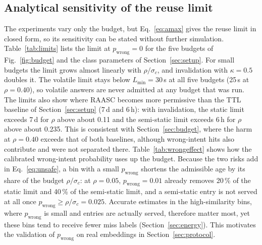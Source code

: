 \documentclass[journal]{IEEEtran}
\newcommand{\pct}{\,\%}
\begin{document}
\subsection{Analytical sensitivity of the reuse limit}\label{sec:sens}
The experiments vary only the budget, but Eq.~\eqref{eq:amax} gives the reuse limit in closed form, so its sensitivity can be stated without further simulation. Table~\ref{tab:limits} lists the limit at $p_{\text{wrong}}=0$ for the five budgets of Fig.~\ref{fig:budget} and the class parameters of Section~\ref{sec:setup}. For small budgets the limit grows almost linearly with $\rho/\sigma_c$, and invalidation with $\kappa=0.5$ doubles it. The volatile limit stays below $L_{\min}=30\,$s at all five budgets (25\,s at $\rho=0.40$), so volatile answers are never admitted at any budget that was run. The limits also show where RAASC becomes more permissive than the TTL baseline of Section~\ref{sec:setup} (7\,d and 6\,h): with invalidation, the static limit exceeds 7\,d for $\rho$ above about 0.11 and the semi-static limit exceeds 6\,h for $\rho$ above about 0.235. This is consistent with Section~\ref{sec:budget}, where the harm at $\rho=0.40$ exceeds that of both baselines, although wrong-intent hits also contribute and were not separated there. Table~\ref{tab:wrongeffect} shows how the calibrated wrong-intent probability uses up the budget. Because the two risks add in Eq.~\eqref{eq:unsafe}, a bin with a small $p_{\text{wrong}}$ shortens the admissible age by its share of the budget $\rho/\sigma_c$: at $\rho=0.05$, $p_{\text{wrong}}=0.01$ already removes 20\pct{} of the static limit and 40\pct{} of the semi-static limit, and a semi-static entry is not served at all once $p_{\text{wrong}}\ge\rho/\sigma_c=0.025$. Accurate estimates in the high-similarity bins, where $p_{\text{wrong}}$ is small and entries are actually served, therefore matter most, yet these bins tend to receive fewer miss labels (Section~\ref{sec:energy}). This motivates the validation of $p_{\text{wrong}}$ on real embeddings in Section~\ref{sec:protocol}.
\end{document}
